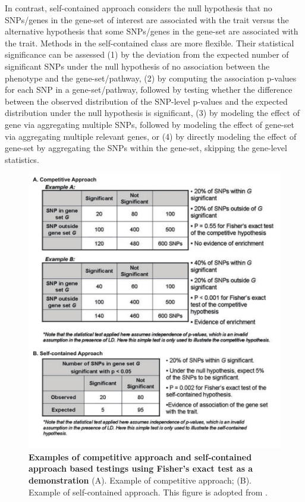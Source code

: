 \documentclass[12pt]{article}
\begin{document}
In contrast, self-contained approach considers the null hypothesis that no SNPs/genes in the gene-set of interest are associated with the trait versus the alternative hypothesis that some SNPs/genes in the gene-set are associated with the trait. Methods in the self-contained class are more flexible. Their statistical significance can be assessed (1) by the deviation from the expected number of significant SNPs under the null hypothesis of no association between the phenotype and the gene-set/pathway, (2) by computing the association p-values for each SNP in a gene-set/pathway, followed by testing whether the difference between the observed distribution of the SNP-level p-values and the expected distribution under the null hypothesis is significant, (3) by modeling the effect of gene via aggregating multiple SNPs, followed by modeling the effect of gene-set via aggregating multiple relevant genes, or (4) by directly modeling the effect of gene-set by aggregating the SNPs within the gene-set, skipping the gene-level statistics.

\begin{figure}[H]
\centering
\includegraphics[scale=0.5]{CompetitiveVsConstrained_illustration_example}

\caption{ \textbf{Examples of competitive approach and self-contained approach based testings using Fisher's exact test as a demonstration} (A). Example of competitive approach; (B). Example of self-contained approach. This figure is adopted from \cite{Fridley2011}. \label{fig: CompetitiveVsConstrained}}
\end{figure}
\end{document}

